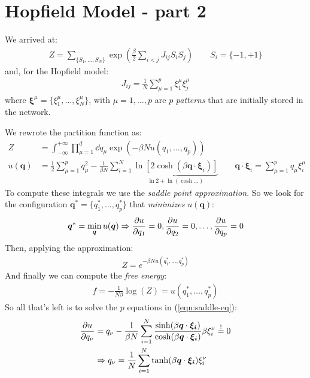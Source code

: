 \documentclass[../template.tex]{subfiles}
\begin{document}
\section{Hopfield Model - part 2}
We arrived at:
\begin{align*}
    Z = \sum_{\{S_1, \dots, S_N\}} \exp\left(\frac{\beta}{2} \sum_{i < j} J_{ij} S_i S_j\right) \qquad S_i = \{-1,+1\}
\end{align*}
and, for the Hopfield model:
\begin{align*}
    J_{ij} = \frac{1}{N} \sum_{\mu=1}^p \xi_1^\mu \xi_j^\mu 
\end{align*}
where $\bm{\xi}^\mu = \{\xi_1^\mu, \dots, \xi_N^\mu\}$, with $\mu = 1, \dots, p$  are $p$ \textit{patterns} that are initially stored in the network. 

We rewrote the partition function as:
\begin{align*}
    Z &= \int_{-\infty}^{+\infty} \prod_{\mu =1}^d \dd{q_\mu} \exp\left(-\beta N u(q_1, \dots, q_p)\right)\\
    u(\bm{q}) &= \frac{1}{2} \sum_{\mu=1}^p q_\mu^2 - \frac{1}{\beta N } \sum_{i=1}^N\underbrace{ \ln \left[2 \cosh(\beta \bm{q}\cdot \bm{\xi}_i)\right]}_{\ln 2 + \ln (\cosh \dots)}   \qquad \bm{q}\cdot \bm{\xi}_i = \sum_{\mu=1}^p q_{\mu} \xi_i^\mu
\end{align*}
To compute these integrals we use the \textit{saddle point approximation}. So we look for the configuration $\bm{q}^* = \{q_1^*, \dots, q^*_p\}$ that \textit{minimizes} $u(\bm{q})$:
\begin{align}
    \bm{q}^* = \min_{\bm{q}} u(\bm{q}) \Rightarrow \pdv{u}{q_1} = 0, \pdv{u}{q_2} = 0, \dots, \pdv{u}{q_p}=0
    \label{eqn:saddle-eq}
\end{align}    
Then, applying the approximation:
\begin{align*}
    Z = e^{-\beta N u(q_1^*, \dots, q^*_p)}
\end{align*}
And finally we can compute the \textit{free energy}:
\begin{align*}
    f = -\frac{1}{N \beta}\log(Z) = u(q_1^*, \dots, q^*_p) 
\end{align*} 
So all that's left is to solve the $p$ equations in (\ref{eqn:saddle-eq}):
\begin{align*}
    \pdv{u}{q_\nu} &= q_\nu - \frac{1}{\beta N} \sum_{i=1}^N \frac{\sinh(\beta \bm{q}\cdot \bm{\xi_i})}{\cosh(\beta \bm{q}\cdot \bm{\xi_i})} \beta \xi_i^\nu \overset{!}{=} 0\\
    &\Rightarrow q_\nu = \frac{1}{N} \sum_{i=1}^N \tanh(\beta \bm{q}\cdot \bm{\xi_i}) \xi_i^\nu  
\end{align*}
\end{document}
